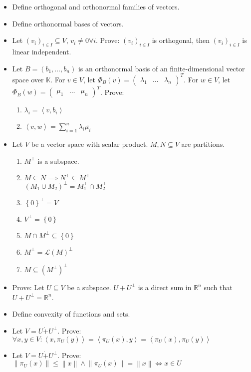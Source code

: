 \documentclass[a4paper]{article}
\newcommand{\set}[1]{\left\{#1\right\}}
\newcommand{\ip}[2]{\left\langle#1,#2\right\rangle} %
\newcommand{\norm}[1]{\left\|#1\right\|}
\begin{document}
\begin{itemize}
  \item Define orthogonal and orthonormal families of vectors.
  \item Define orthonormal bases of vectors.
  \item Let $(v_i)_{i \in I} \subseteq V$, $v_i \neq 0 \forall i$. Prove: $(v_i)_{i \in I}$ is orthogonal, then $(v_i)_{i \in I}$ is linear independent.
  \item Let $B = (b_1, \ldots, b_n)$ is an orthonormal basis of an finite-dimensional vector space over $\mathbb K$.
    For $v \in V$, let $\Phi_B(v) = \begin{pmatrix} \lambda_1 & \dots & \lambda_n \end{pmatrix}^T$.
    For $w \in V$, let $\Phi_B(w) = \begin{pmatrix} \mu_1 & \dots & \mu_n \end{pmatrix}^T$. Prove:
    \begin{enumerate}
      \item $\lambda_i = \ip{v}{b_i}$
      \item $\ip vw = \sum_{i=1}^n \lambda_i \overline{\mu_i}$
    \end{enumerate}
  \item Let $V$ be a vector space with scalar product. $M, N \subseteq V$ are partitions.
    \begin{enumerate}
      \item $M^\bot$ is a subspace.
      \item $M \subseteq N \implies N^\bot \subseteq M^\bot$ \\
        $(M_1 \cup M_2)^\bot = M_1^\bot \cap M_2^\bot$
      \item $\set{0}^\bot = V$
      \item $V^\bot = \set{0}$
      \item $M \cap M^\bot \subseteq \set{0}$
      \item $M^\bot = \mathcal L(M)^\bot$
      \item $M \subseteq (M^\bot)^\bot$
    \end{enumerate}
  \item Prove: Let $U \subseteq V$ be a subspace. $U + U^\bot$ is a direct sum in $\mathbb R^n$ such that $U + U^\bot = \mathbb R^n$.
  \item Define convexity of functions and sets.
  \item Let $V = U \dot+ U^{\bot}$. Prove: $\forall x, y \in V: \ip{x}{\pi_{U}(y)} = \ip{\pi_U(x)}{y} = \ip{\pi_U(x)}{\pi_U(y)}$
  \item Let $V = U \dot+ U^{\bot}$. Prove: $\norm{\pi_U(x)} \leq \norm{x} \land \norm{\pi_U(x)} = \norm{x} \iff x \in U$

\end{itemize}
\end{document}
